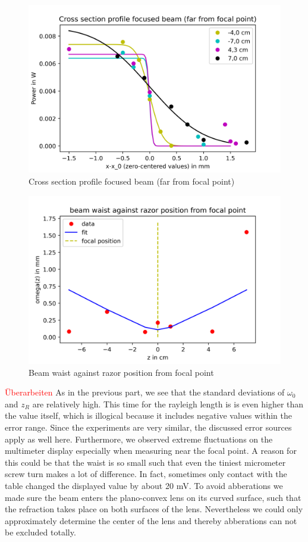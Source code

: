 \documentclass{article}
\begin{document}
\begin{figure}[h!]
\includegraphics[width=\textwidth]{Cross section profile focused beam (far from focal point).png}
\caption{Cross section profile focused beam (far from focal point)}
\label{far_focal}
\end{figure}

\begin{figure}[h!]
\includegraphics[width=\textwidth]{beam waist against razor position from focal point.png}
\caption{Beam waist against razor position from focal point}
\label{beam_waist}
\end{figure}

\textcolor{red}{Überarbeiten}
As in the previous part, we see that the standard deviations of $\omega_{0}$ and $z_{R}$ are relatively high. This time for the rayleigh length is is even higher than the value itself, which is illogical because it includes negative values within the error range. Since the experiments are very similar, the discussed error sources apply as well here. Furthermore, we observed extreme fluctuations on the multimeter display especially when measuring near the focal point. A reason for this could be that the waist is so small such that even the tiniest micrometer screw turn makes a lot of difference. In fact, sometimes only contact with the table changed the displayed value by about 20 mV. To avoid abberations we made sure the beam enters the plano-convex lens on its curved surface, such that the refraction takes place on both surfaces of the lens. Nevertheless we could only approximately determine the center of the lens and thereby abberations can not be excluded totally.
\end{document}
